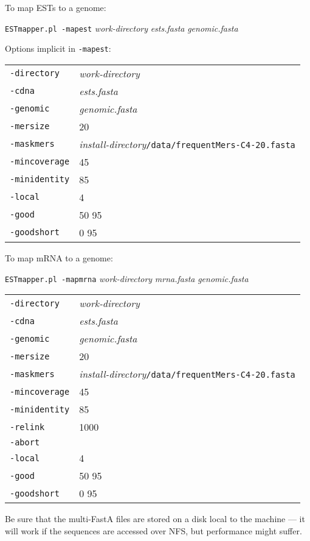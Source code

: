 \documentclass[twoside,11pt]{book}
\begin{document}
To map ESTs to a genome:

{\tt ESTmapper.pl -mapest} {\it work-directory} {\it ests.fasta} {\it genomic.fasta}

Options implicit in {\tt -mapest}:

\begin{tabular}{|ll|}
\hline
{\tt -directory}      & {\it work-directory} \\
{\tt -cdna}           & {\it ests.fasta} \\
{\tt -genomic}        & {\it genomic.fasta} \\
{\tt -mersize}        & 20 \\
{\tt -maskmers}       & {\it install-directory}{\tt /data/frequentMers-C4-20.fasta} \\
{\tt -mincoverage}    & 45 \\
{\tt -minidentity}    & 85 \\
{\tt -local}          & 4 \\
{\tt -good}           & 50 95 \\
{\tt -goodshort}      & 0 95 \\
\hline
\end{tabular}

To map mRNA to a genome:

{\tt ESTmapper.pl -mapmrna} {\it work-directory} {\it mrna.fasta} {\it genomic.fasta}

\begin{tabular}{|ll|}
\hline
{\tt -directory}      & {\it work-directory} \\
{\tt -cdna}           & {\it ests.fasta} \\
{\tt -genomic}        & {\it genomic.fasta} \\
{\tt -mersize}        & 20 \\
{\tt -maskmers}       & {\it install-directory}{\tt /data/frequentMers-C4-20.fasta} \\
{\tt -mincoverage}    & 45 \\
{\tt -minidentity}    & 85 \\
{\tt -relink}         & 1000 \\
{\tt -abort}          & \\
{\tt -local}          & 4 \\
{\tt -good}           & 50 95 \\
{\tt -goodshort}      & 0 95 \\
\hline
\end{tabular}

Be sure that the multi-FastA files are stored on a disk local to the
machine --- it will work if the sequences are accessed over NFS, but
performance might suffer.
\end{document}
